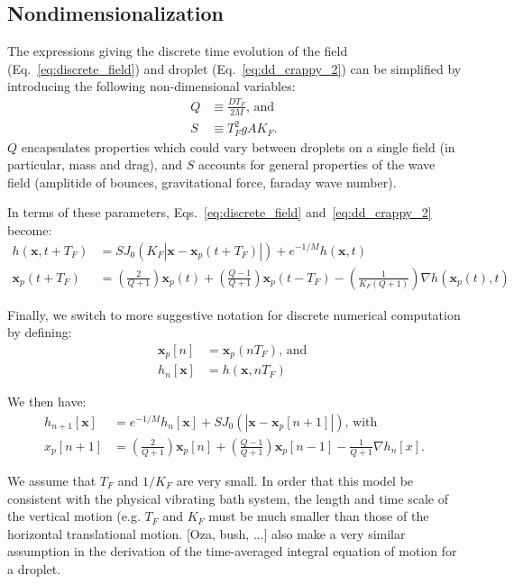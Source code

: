 \documentclass{article}
\newcommand{\x}{\mathbf{x}}
\begin{document}
\subsection{Nondimensionalization}
The expressions giving the discrete time evolution of the field (Eq.~\ref{eq:discrete_field}) and droplet (Eq.~\ref{eq:dd_crappy_2}) can be simplified by introducing the following non-dimensional variables:
\begin{align}
	Q &\equiv \frac{D T_F}{2 M}\text{, and }\\
	S &\equiv T_F^2 g A K_{F}.
\end{align}
$Q$ encapsulates properties which could vary between droplets on a single field (in particular, mass and drag), and $S$ accounts for general properties of the wave field (amplitide of bounces, gravitational force, faraday wave number).

In terms of these parameters, Eqs.~\ref{eq:discrete_field} and~\ref{eq:dd_crappy_2} become:
\begin{align}
	h(\x,t+T_F) &= S J_0 \left( K_F \left| \x - \x_p(t + T_F) \right | \right) + e^{-1/M} h(\x,t) \label{eq:nondim_field} \\
	\x_p(t + T_F) &= \left( \frac{2}{Q+1} \right) \x_p(t) + \left( \frac{Q-1}{Q+1} \right) \x_p(t - T_F) - \left( \frac{1}{K_F(Q+1)} \right) \nabla h(\x_p(t),t) \label{eq:nondim_field}
\end{align}

Finally, we switch to more suggestive notation for discrete numerical computation by defining:
\begin{align}
	\x_p[n] &= \x_p(n T_F) \text{, and }\\
	h_n[\x] &= h(\x,n T_F)
\end{align}

We then have:
\begin{align}
	h_{n+1}[\x] &= e^{-1/M} h_n[\x] + S J_{0}(|\x - \x_p[n+1]|) \text{, with } \label{eq:field_evolution}\\
	x_p[n+1] &= \left( \frac{2}{Q+1} \right) \x_p[n] + \left( \frac{Q-1}{Q+1} \right) \x_p[n-1] - \frac{1}{Q+1} \nabla h_{n}[x]\label{eq:drop_evolution}.
\end{align}

We assume that $T_{F}$ and $1/K_{F}$ are very small. In order that this model be consistent with the physical vibrating bath system, the length and time scale of the vertical motion (e.g. $T_{F}$ and $K_{F}$ must be much smaller than those of the horizontal translational motion. 
[Oza, bush, ...] also make a very similar assumption in the derivation of the time-averaged integral equation of motion for a droplet.
\end{document}
